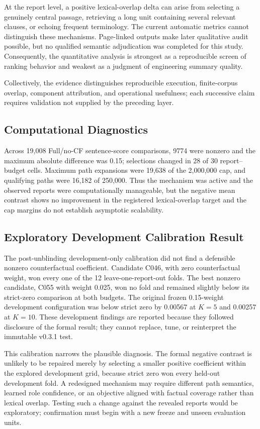 \documentclass[applsci,article,submit,moreauthors]{Definitions/mdpi}
\begin{document}
At the report level, a positive lexical-overlap delta can arise from selecting a genuinely central passage, retrieving a long unit containing several relevant clauses, or echoing frequent terminology. The current automatic metrics cannot distinguish these mechanisms. Page-linked outputs make later qualitative audit possible, but no qualified semantic adjudication was completed for this study. Consequently, the quantitative analysis is strongest as a reproducible screen of ranking behavior and weakest as a judgment of engineering summary quality.

Collectively, the evidence distinguishes reproducible execution, finite-corpus overlap, component attribution, and operational usefulness; each successive claim requires validation not supplied by the preceding layer.

\subsection{Computational Diagnostics}

Across 19,008 Full/no-CF sentence-score comparisons, 9774 were nonzero and the maximum absolute difference was 0.15; selections changed in 28 of 30 report--budget cells. Maximum path expansions were 19,638 of the 2,000,000 cap, and qualifying paths were 16,182 of 250,000. Thus the mechanism was active and the observed reports were computationally manageable, but the negative mean contrast shows no improvement in the registered lexical-overlap target and the cap margins do not establish asymptotic scalability.

\subsection{Exploratory Development Calibration Result}

The post-unblinding development-only calibration did not find a defensible nonzero counterfactual coefficient. Candidate C046, with zero counterfactual weight, won every one of the 12 leave-one-report-out folds. The best nonzero candidate, C055 with weight 0.025, won no fold and remained slightly below its strict-zero comparison at both budgets. The original frozen 0.15-weight development configuration was below strict zero by 0.00567 at $K=5$ and 0.00257 at $K=10$. These development findings are reported because they followed disclosure of the formal result; they cannot replace, tune, or reinterpret the immutable v0.3.1 test.

This calibration narrows the plausible diagnosis. The formal negative contrast is unlikely to be repaired merely by selecting a smaller positive coefficient within the explored development grid, because strict zero won every held-out development fold. A redesigned mechanism may require different path semantics, learned role confidence, or an objective aligned with factual coverage rather than lexical overlap. Testing such a change against the revealed reports would be exploratory; confirmation must begin with a new freeze and unseen evaluation units.
\end{document}

